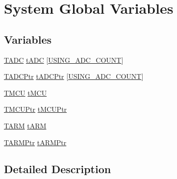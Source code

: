 \hypertarget{group___sys_glb_var}{\section{System Global Variables}
\label{group___sys_glb_var}
}
\subsection*{Variables}
\begin{DoxyCompactItemize}
\item 
\hyperlink{struct_t_a_d_c}{T\-A\-D\-C} \hyperlink{group___sys_glb_var_gaebcbb78adc896471154fad49dcf9e4fe}{t\-A\-D\-C} \mbox{[}\hyperlink{group___a_d_c_const_gaca9e5377ccfd63366108499355649849}{U\-S\-I\-N\-G\-\_\-\-A\-D\-C\-\_\-\-C\-O\-U\-N\-T}\mbox{]}
\item 
\hyperlink{struct_t_a_d_c}{T\-A\-D\-C\-Ptr} \hyperlink{group___sys_glb_var_gac5b8c2fb968c82ec4db40435a7ed5deb}{t\-A\-D\-C\-Ptr} \mbox{[}\hyperlink{group___a_d_c_const_gaca9e5377ccfd63366108499355649849}{U\-S\-I\-N\-G\-\_\-\-A\-D\-C\-\_\-\-C\-O\-U\-N\-T}\mbox{]}
\item 
\hyperlink{struct_t_m_c_u}{T\-M\-C\-U} \hyperlink{group___sys_glb_var_ga1da6113a394709910a14e2420a9d0a25}{t\-M\-C\-U}
\item 
\hyperlink{struct_t_m_c_u}{T\-M\-C\-U\-Ptr} \hyperlink{group___sys_glb_var_ga772826721d8d3133eaae07595c5cf644}{t\-M\-C\-U\-Ptr}
\item 
\hyperlink{struct_t_a_r_m}{T\-A\-R\-M} \hyperlink{group___sys_glb_var_ga972a65f6570934796a8c976fdaf313f6}{t\-A\-R\-M}
\item 
\hyperlink{struct_t_a_r_m}{T\-A\-R\-M\-Ptr} \hyperlink{group___sys_glb_var_gab23eba564757132337b659ce7b4bcf9e}{t\-A\-R\-M\-Ptr}
\end{DoxyCompactItemize}


\subsection{Detailed Description}


